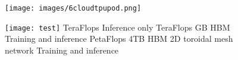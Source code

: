 \documentclass[c]{beamer}
\begin{document}
\begin{frame} [c]
\begin{figure}[t]
{\begin{minipage}{145pt}
\begin{center}
            \label{fig: cloud TPU}
            \texttt{[image: images/6cloudtpupod.png]}
              \label{fig: TPU pod}
            \end{center}
  \end{minipage}}
   {\begin{minipage}{120pt}
    \texttt{[image: test]}
    \newline
    \newline
   {\small {} TeraFlops \newline
   \space \space Inference only
   \newline
   \newline
\newline
\newline
\space {} TeraFlops\newline 
\space {} GB HBM\newline
\space \space Training and inference
\newline
\newline
\newline
\space  {} PetaFlops\newline
\space  \space 4TB HBM\newline
\space \space 2D toroidal mesh network \newline
\space \space Training and inference\newline}

  \end{minipage}}
\end{figure}
	\end{frame}
	
\end{document}

